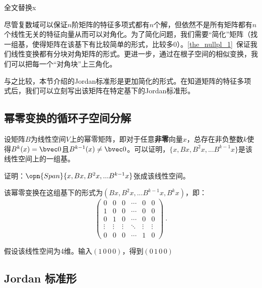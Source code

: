 

\begin{issues}
\issueDraft 全文替换x
\end{issues}
尽管复数域可以保证$n$阶矩阵的特征多项式都有$n$个解，但依然不是所有矩阵都有$n$个线性无关的特征向量从而可以对角化。为了简化问题，我们需要“简化”矩阵（找一组基，使得矩阵在该基下有比较简单的形式，比较多$0$）。\autoref{the_nullpl_1}~保证我们线性变换都有分块对角矩阵的形式。更进一步，通过在根子空间的相似变换，我们可以把每一个“对角块”上三角化。

与之比较，本节介绍的Jordan标准形是更加简化的形式。在知道矩阵的特征多项式后，我们可以立刻写出该矩阵在特定基下的Jordan标准形。
\subsection{幂零变换的循环子空间分解}
设矩阵$B$为线性空间$V$上的幂零矩阵，即对于任意\textbf{非零}向量$x$，总存在非负整数$k$使得$B^{k}(x)=\bvec 0$且$B^{k-1}(x)\neq \bvec 0$。可以证明，$\{x,Bx,B^2x,...B^{k-1}x\}$是该线性空间上的一组基。
\begin{exercise}{}
证明：$\opn{Span}\{x,Bx,B^2x,...B^{k-1}x\}$张成该线性空间。
\end{exercise}
该幂零变换在这组基下的形式为$(Bx,B^2x,...B^{k-1}x,B^kx)$，即：
\begin{equation}
\left(\begin{array}{cccccc}
0 & 0 & 0 & \cdots & 0 & 0 \\
1 & 0 & 0 & \cdots & 0 & 0 \\
0 & 1 & 0 & \cdots & 0 & 0 \\
\vdots & \vdots & \vdots & \ddots & \vdots & \vdots \\
0 & 0 & 0 & \cdots & 1 & 0
\end{array}\right)~.
\end{equation}

假设该线性空间为4维。输入$(1\,0\,0\,0)$，得到$(0\,1\,0\,0)$

\subsection{Jordan 标准形}